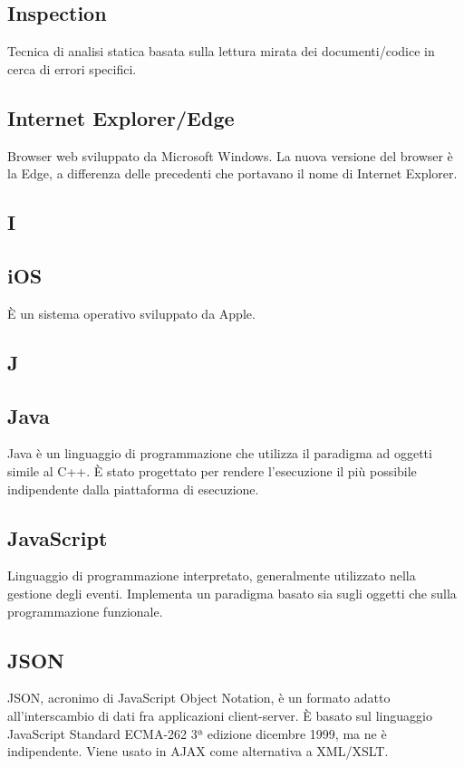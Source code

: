 \subsection*{Inspection }
Tecnica di analisi statica basata sulla lettura mirata dei documenti/codice in cerca di
errori specifici.

\subsection*{Internet Explorer/Edge}
Browser web sviluppato da Microsoft Windows. La nuova versione del browser è la Edge, a differenza delle precedenti che portavano il nome di Internet Explorer.

\newpage

\begin{center}
\Huge\section*{\uppercase{i}}
\end{center}

\subsection*{iOS}
È un sistema operativo sviluppato da Apple.

\newpage

\begin{center}
\Huge\section*{\uppercase{J}}
\end{center}

\subsection*{Java}
Java è un linguaggio di programmazione che utilizza il paradigma ad oggetti simile al C++. È stato
progettato per rendere l'esecuzione il più possibile indipendente dalla piattaforma di
esecuzione.

\subsection*{JavaScript}
Linguaggio di programmazione interpretato, generalmente utilizzato nella gestione
degli eventi. Implementa un paradigma basato sia sugli oggetti che sulla programmazione
funzionale.

\subsection*{JSON}
JSON, acronimo di JavaScript Object Notation, è un formato adatto all'interscambio di dati fra applicazioni client-server. È basato sul linguaggio JavaScript Standard ECMA-262 3ª edizione dicembre 1999, ma ne è indipendente. Viene usato in AJAX come alternativa a XML/XSLT.

